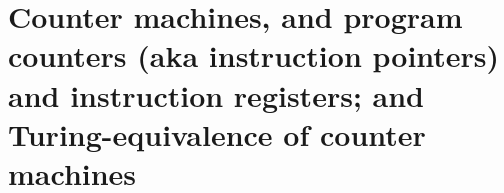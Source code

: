 
\chapter{Counter machines, and program counters (aka instruction pointers) and instruction registers; and Turing-equivalence of counter machines}
